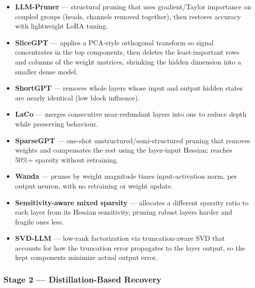 \documentclass[
11pt, %
english, %
singlespacing, %
headsepline, %
]{MastersDoctoralThesis} %
\begin{document}
\begin{itemize}

  \item \textbf{LLM-Pruner} \cite{ma2023llmpruner} --- structural pruning that uses gradient/Taylor importance on coupled groups (heads, channels removed together), then restores accuracy with lightweight LoRA tuning.

  \item \textbf{SliceGPT} \cite{ashkboos2024slicegpt} --- applies a PCA-style orthogonal transform so signal concentrates in the top components, then deletes the least-important rows and columns of the weight matrices, shrinking the hidden dimension into a smaller dense model.

  \item \textbf{ShortGPT} \cite{men2024shortgpt} --- removes whole layers whose input and output hidden states are nearly identical (low block influence).

  \item \textbf{LaCo} \cite{yang2024laco} --- merges consecutive near-redundant layers into one to reduce depth while preserving behaviour.

  \item \textbf{SparseGPT} \cite{frantar2023sparsegpt} --- one-shot unstructured/semi-structured pruning that removes weights and compensates the rest using the layer-input Hessian; reaches 50\%+ sparsity without retraining.

  \item \textbf{Wanda} \cite{sun2024wanda} --- prunes by weight magnitude times input-activation norm, per output neuron, with no retraining or weight update.

  \item \textbf{Sensitivity-aware mixed sparsity} \cite{shao2024sensitivity} --- allocates a different sparsity ratio to each layer from its Hessian sensitivity, pruning robust layers harder and fragile ones less.

  \item \textbf{SVD-LLM} \cite{wang2025svdllm} --- low-rank factorization via truncation-aware SVD that accounts for how the truncation error propagates to the layer output, so the kept components minimize actual output error.

\end{itemize}

\subsubsection{Stage 2 --- Distillation-Based Recovery}
\end{document}
